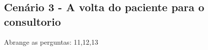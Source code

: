 \documentclass[12pt]{article}
\begin{document}
\subsection{Cenário 3 - A volta do paciente para o consultorio}
Abrange as perguntas: 11,12,13
\end{document}
